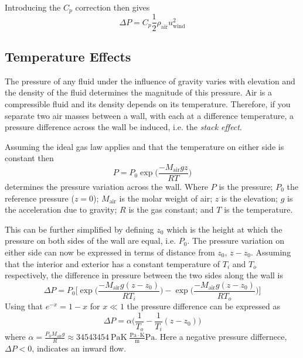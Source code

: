 Introducing the $C_p$ correction then gives
\begin{equation}\label{eq:wind_pressure}
  \Delta P = C_p \frac{1}{2} \rho_\mathrm{air} u_\mathrm{wind}^2
\end{equation}


\subsection{Temperature Effects}

The pressure of any fluid under the influence of gravity varies with elevation and the density of the fluid determines the magnitude of this pressure.
Air is a compressible fluid and its density depends on its temperature.
Therefore, if you separate two air masses between a wall, with each at a difference temperature, a pressure difference across the wall be induced, i.e. the \textit{stack effect}.

Assuming the ideal gas law applies and that the temperature on either side is constant then
\begin{equation}
  P = P_0 \exp{\Big( \frac{-M_\mathrm{air}gz}{RT} \Big)}
\end{equation}
determines the pressure variation across the wall.
Where $P$ is the pressure;
$P_0$ the reference pressure ($z=0$);
$M_\mathrm{air}$ is the molar weight of air;
$z$ is the elevation;
$g$ is the acceleration due to gravity;
$R$ is the gas constant;
and $T$ is the temperature.\par

This can be further simplified by defining $z_0$ which is the height at which the pressure on both sides of the wall are equal, i.e. $P_0$.
The pressure variation on either side can now be expressed in terms of distance from $z_0$, $z-z_0$.
Assuming that the interior and exterior has a constant temperature of $T_i$ and $T_o$ respectively, the difference in pressure between the two sides along the wall is
\begin{equation}
  \Delta P = P_0 \Big[ \exp{\Big( \frac{-M_\mathrm{air}g(z-z_0)}{RT_i} \Big)} - \exp{\Big( \frac{-M_\mathrm{air}g(z-z_0)}{RT_o} \Big)} \Big]
\end{equation}
Using that $e^{-x} = 1 - x$ for $x \ll 1$ the pressure difference can be expressed as
\begin{equation}
  \Delta P = \alpha \Big( \frac{1}{T_o} - \frac{1}{T_i} (z-z_0)\Big)
\end{equation}
where $\alpha = \frac{P_0 M_\mathrm{air} g}{R} \approx 3454 \SI{3454}{\pascal\kelvin} \; \mathrm{ \frac{Pa \cdot K}{m}Pa}$.
Here a negative pressure differnece, $\Delta P < 0$, indicates an inward flow.\par


